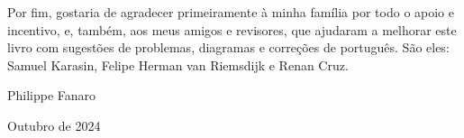 Por fim, gostaria de agradecer primeiramente à minha família por todo o apoio e incentivo, e, também, aos meus amigos e revisores, que ajudaram a melhorar este livro com sugestões de problemas, diagramas e correções de português. São eles: Samuel Karasin, Felipe Herman van Riemsdijk e Renan Cruz.

\bigskip
\smallskip
\smallskip
\smallskip

\hspace*{\fill} Philippe Fanaro \hspace{0.055cm}

\hspace*{\fill} Outubro de 2024 \hspace{0.05cm}

\blankpage
\blankpage